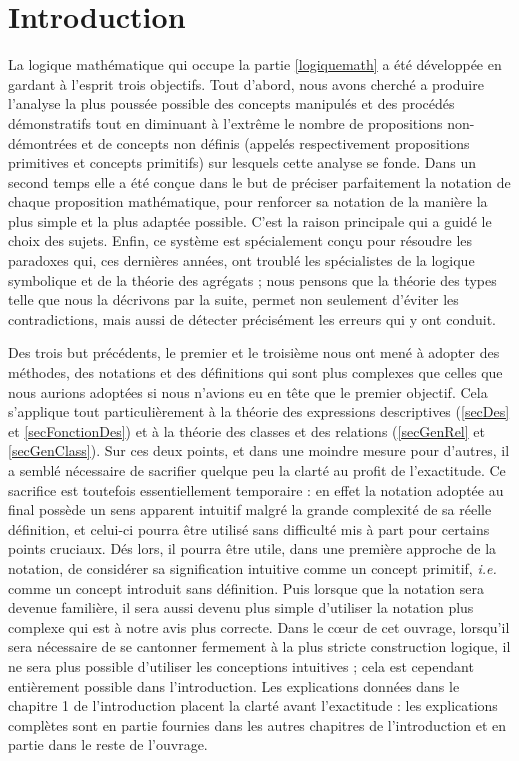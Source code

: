 \documentclass[a4paper]{book}
\begin{document}
\part*{Introduction}

La logique mathématique qui occupe la partie \ref{logiquemath} a été développée en gardant à l'esprit trois objectifs. Tout d'abord, nous avons cherché a produire l'analyse la plus poussée possible des concepts manipulés et des procédés démonstratifs tout en diminuant à l'extrême le nombre de propositions non-démontrées et de concepts non définis (appelés respectivement propositions primitives et concepts primitifs) sur lesquels cette analyse se fonde. Dans un second temps elle a été conçue dans le but de préciser parfaitement la notation de chaque proposition mathématique, pour renforcer sa notation de la manière la plus simple et la plus adaptée possible. C'est la raison principale qui a guidé le choix des sujets. Enfin, ce système est spécialement conçu pour résoudre les paradoxes qui, ces dernières années, ont troublé les spécialistes de la logique symbolique et de la théorie des agrégats ; nous pensons que la théorie des types telle que nous la décrivons par la suite, permet non seulement d'éviter les contradictions, mais aussi de détecter précisément les erreurs qui y ont conduit.

Des trois but précédents, le premier et le troisième nous ont mené à adopter des méthodes, des notations et des définitions qui sont plus complexes que celles que nous aurions adoptées si nous n'avions eu en tête que le premier objectif. Cela s'applique tout particulièrement à la théorie des expressions descriptives (\ref{secDes} et \ref{secFonctionDes}) et à la théorie des classes et des relations (\ref{secGenRel} et \ref{secGenClass}). Sur ces deux points, et dans une moindre mesure pour d'autres, il a semblé nécessaire de sacrifier quelque peu la clarté au profit de l'exactitude. Ce sacrifice est toutefois essentiellement temporaire : en effet la notation adoptée au final possède un sens apparent intuitif malgré la grande complexité de sa réelle définition, et celui-ci pourra être utilisé sans difficulté mis à part pour certains points cruciaux. Dés lors, il pourra être utile, dans une première approche de la notation, de considérer sa signification intuitive comme un concept primitif, \textit{i.e.} comme un concept introduit sans définition. Puis lorsque que la notation sera devenue familière, il sera aussi devenu plus simple d'utiliser la notation plus complexe qui est à notre avis plus correcte. Dans le c\oe ur de cet ouvrage, lorsqu'il sera nécessaire de se cantonner fermement à la plus stricte construction logique, il ne sera plus possible d'utiliser les conceptions intuitives ; cela est cependant entièrement possible dans l'introduction. Les explications données dans le chapitre 1 de l'introduction placent la clarté avant l'exactitude : les explications complètes sont en partie fournies dans les autres chapitres de  l'introduction et en partie dans le reste de l'ouvrage.
\end{document}

